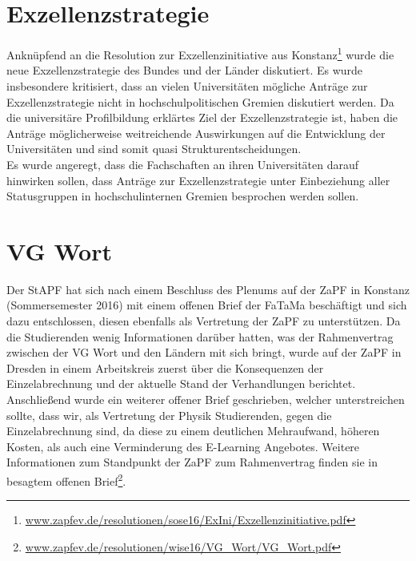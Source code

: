 \section*{Exzellenzstrategie}
Anknüpfend an die Resolution zur Exzellenzinitiative aus Konstanz\footnote{\href{https://zapfev.de/resolutionen/sose16/ExIni/Exzellenzinitiative.pdf}{\url{www.zapfev.de/resolutionen/sose16/ExIni/Exzellenzinitiative.pdf}}} 
wurde die neue Exzellenzstrategie des Bundes und der Länder diskutiert. Es wurde insbesondere kritisiert, dass an vielen Universitäten mögliche Anträge zur 
Exzellenzstrategie nicht in hochschulpolitischen Gremien diskutiert werden. Da die universitäre Profilbildung erklärtes Ziel der Exzellenzstrategie ist, 
haben die Anträge möglicherweise weitreichende Auswirkungen auf die Entwicklung der Universitäten und sind somit quasi Strukturentscheidungen.\\
Es wurde angeregt, dass die Fachschaften an ihren Universitäten darauf hinwirken sollen, dass Anträge zur Exzellenzstrategie unter Einbeziehung 
aller Statusgruppen in hochschulinternen Gremien besprochen werden sollen.

\section*{VG Wort}
Der StAPF hat sich nach einem Beschluss des Plenums auf der ZaPF in Konstanz (Sommersemester 2016) mit einem offenen Brief der FaTaMa beschäftigt und sich dazu entschlossen, 
diesen ebenfalls als Vertretung der ZaPF zu unterstützen. Da die Studierenden wenig Informationen darüber hatten, was der Rahmenvertrag zwischen der VG Wort und den 
Ländern mit sich bringt, wurde auf der ZaPF in Dresden in einem Arbeitskreis zuerst über die Konsequenzen der Einzelabrechnung und der aktuelle Stand der Verhandlungen 
berichtet. Anschließend wurde ein weiterer offener Brief geschrieben, welcher unterstreichen sollte, dass wir, als Vertretung der Physik Studierenden, gegen die 
Einzelabrechnung sind, da diese zu einem deutlichen Mehraufwand, höheren Kosten, als auch eine Verminderung des E-Learning Angebotes. Weitere Informationen zum 
Standpunkt der ZaPF zum Rahmenvertrag finden sie in besagtem offenen 
Brief\footnote{\href{https://zapfev.de/resolutionen/wise16/VG_Wort/VG_Wort.pdf}{\url{www.zapfev.de/resolutionen/wise16/VG_Wort/VG_Wort.pdf}}}. 

